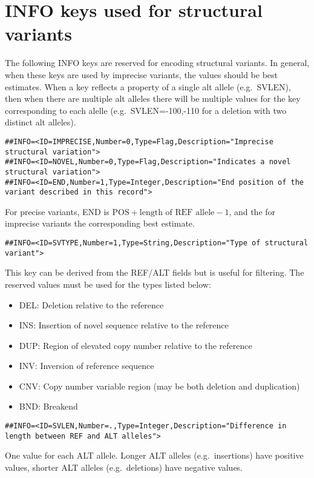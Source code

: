 \documentclass[8pt]{article}
\begin{document}
\section{INFO keys used for structural variants}
\label{sv-info-keys}
\begin{samepage}
The following INFO keys are reserved for encoding structural variants.
In general, when these keys are used by imprecise variants, the values should be best estimates.
When a key reflects a property of a single alt allele (e.g.\ SVLEN), then when there are multiple alt alleles there will be multiple values for the key corresponding to each alelle (e.g.\ SVLEN=-100,-110 for a deletion with two distinct alt alleles).
\footnotesize
\begin{verbatim}
##INFO=<ID=IMPRECISE,Number=0,Type=Flag,Description="Imprecise structural variation">
##INFO=<ID=NOVEL,Number=0,Type=Flag,Description="Indicates a novel structural variation">
##INFO=<ID=END,Number=1,Type=Integer,Description="End position of the variant described in this record">
\end{verbatim}
\normalsize
For precise variants, END is $\mbox{POS} + \mbox{length of REF allele} - 1$, and the for imprecise variants the corresponding best estimate.

\footnotesize
\begin{verbatim}
##INFO=<ID=SVTYPE,Number=1,Type=String,Description="Type of structural variant">
\end{verbatim}
\normalsize
\end{samepage}
This key can be derived from the REF/ALT fields but is useful for filtering.
The reserved values must be used for the types listed below:
\begin{itemize}
  \item DEL: Deletion relative to the reference
  \item INS: Insertion of novel sequence relative to the reference
  \item DUP: Region of elevated copy number relative to the reference
  \item INV: Inversion of reference sequence
  \item CNV: Copy number variable region (may be both deletion and duplication)
  \item BND: Breakend
\end{itemize}

\footnotesize
\begin{verbatim}
##INFO=<ID=SVLEN,Number=.,Type=Integer,Description="Difference in length between REF and ALT alleles">
\end{verbatim}
\normalsize
One value for each ALT allele. Longer ALT alleles (e.g.\ insertions) have positive values, shorter ALT alleles (e.g.\ deletions) have negative values.
\end{document}
